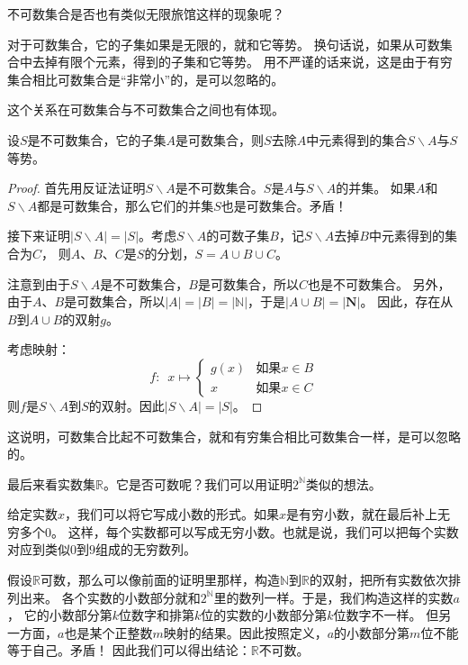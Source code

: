 \documentclass[12pt,UTF8]{ctexbook}
\begin{document}
不可数集合是否也有类似无限旅馆这样的现象呢？

对于可数集合，它的子集如果是无限的，就和它等势。
换句话说，如果从可数集合中去掉有限个元素，得到的子集和它等势。
用不严谨的话来说，这是由于有穷集合相比可数集合是“非常小”的，是可以忽略的。

这个关系在可数集合与不可数集合之间也有体现。

\begin{tm}
    设$S$是不可数集合，它的子集$A$是可数集合，则$S$去除$A$中元素得到的集合$S\backslash A$与$S$等势。
\end{tm}

\begin{proof}
    首先用反证法证明$S\backslash A$是不可数集合。$S$是$A$与$S\backslash A$的并集。
    如果$A$和$S\backslash A$都是可数集合，那么它们的并集$S$也是可数集合。矛盾！

    接下来证明$|S\backslash A| = |S|$。考虑$S\backslash A$的可数子集$B$，记$S\backslash A$去掉$B$中元素得到的集合为$C$，
    则$A$、$B$、$C$是$S$的分划，$S = A\cup B\cup C$。
    
    注意到由于$S\backslash A$是不可数集合，$B$是可数集合，所以$C$也是不可数集合。
    另外，由于$A$、$B$是可数集合，所以$ |A| = |B| = |\mathbb{N}|$，于是$|A\cup B| = |\mathbf{N}|$。
    因此，存在从$B$到$A\cup B$的双射$g$。

    考虑映射：
    $$ f:\,\,\,x\mapsto \left\{
        \begin{array}{cl}
            g(x) & \mbox{如果}x\in B \\
            x & \mbox{如果}x \in C
        \end{array}\right.
    $$
    则$f$是$S\backslash A$到$S$的双射。因此$|S\backslash A| = |S|$。
    
\end{proof}

这说明，可数集合比起不可数集合，就和有穷集合相比可数集合一样，是可以忽略的。

最后来看实数集$\mathbb{R}$。它是否可数呢？我们可以用证明$2^\mathbb{N}$类似的想法。

给定实数$x$，我们可以将它写成小数的形式。如果$x$是有穷小数，就在最后补上无穷多个$0$。
这样，每个实数都可以写成无穷小数。也就是说，我们可以把每个实数对应到类似$0$到$9$组成的无穷数列。

假设$\mathbb{R}$可数，那么可以像前面的证明里那样，构造$\mathbb{N}$到$\mathbb{R}$的双射，把所有实数依次排列出来。
各个实数的小数部分就和$2^\mathbb{N}$里的数列一样。于是，我们构造这样的实数$a$，
它的小数部分第$k$位数字和排第$k$位的实数的小数部分第$k$位数字不一样。
但另一方面，$a$也是某个正整数$m$映射的结果。因此按照定义，$a$的小数部分第$m$位不能等于自己。矛盾！
因此我们可以得出结论：$\mathbb{R}$不可数。
\end{document}
